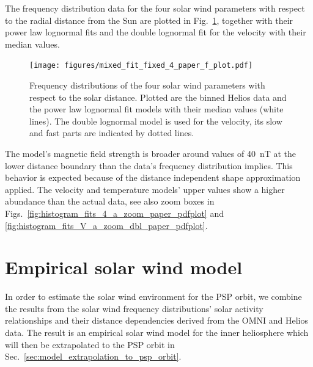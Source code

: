 The frequency distribution data for the four solar wind parameters with respect to the radial distance from the Sun are plotted in Fig.~\ref{fig:mixed_fit_fixed_4_paper_f_plot}, together with their power law lognormal fits and the double lognormal fit for the velocity with their median values.
\begin{figure}
	\texttt{[image: figures/mixed\_fit\_fixed\_4\_paper\_f\_plot.pdf]}
	\caption{Frequency distributions of the four solar wind parameters with respect to the solar distance. Plotted are the binned Helios data and the power law lognormal fit models with their median values (white lines). The double lognormal model is used for the velocity, its slow and fast parts are indicated by dotted lines.}
	\label{fig:mixed_fit_fixed_4_paper_f_plot}
\end{figure}
The model’s magnetic field strength is broader around values of \SI{40}{nT} at the lower distance boundary than the data's frequency distribution implies. This behavior is expected because of the distance independent shape approximation applied. The velocity and temperature models’ upper values show a higher abundance than the actual data, see also zoom boxes in Figs.~\ref{fig:histogram_fits_4_a_zoom_paper_pdfplot} and \ref{fig:histogram_fits_V_a_zoom_dbl_paper_pdfplot}.


\section{Empirical solar wind model}
\label{sec:empirical_solar_wind_model}
In order to estimate the solar wind environment for the PSP orbit, we combine the results from the solar wind frequency distributions’ solar activity relationships and their distance dependencies derived from the OMNI and Helios data. The result is an empirical solar wind model for the inner heliosphere which will then be extrapolated to the PSP orbit in Sec.~\ref{sec:model_extrapolation_to_psp_orbit}.

